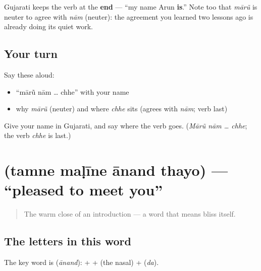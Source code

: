 \begin{grammarlens}[title={Grammar Lens: the verb goes last}]
Gujarati keeps the verb at the \textbf{end} — \textquotedblleft{}my name Arun \textbf{is}.\textquotedblright{} Note too that \emph{mārũ} is neuter to agree with \emph{nām} (neuter): the agreement you learned two lessons ago is already doing its quiet work.
\end{grammarlens}

\subsection*{Your turn}
Say these aloud:

\begin{itemize}
\raggedright
  \item \textquotedblleft{}mārũ nām … chhe\textquotedblright{} with your name
  \item why \emph{mārũ} (neuter) and where \emph{chhe} sits (agrees with \emph{nām}; verb last)
\end{itemize}

\begin{tcolorbox}[breakable,colback=teal!4,colframe=teal!35!black,title={Before you move on}]
Give your name in Gujarati, and say where the verb goes. (\emph{Mārũ nām … chhe}; the verb \emph{chhe} is last.)
\end{tcolorbox}
\section[\texorpdfstring{\gu{તમને} \gu{મળીને} \gu{આનંદ} \gu{થયો} (tamne maḷīne …)}{તમને મળીને આનંદ થયો (tamne maḷīne …)}]{    (tamne maḷīne ānand thayo) — \textquotedblleft{}pleased to meet you\textquotedblright{}}

\label{lesson:GU-C02-anand}



\begin{quote}
The warm close of an introduction — a word that means bliss itself.
\end{quote}

\subsection*{The letters in this word}
The key word is \textbf{} (\emph{ānand}): \textbf{} + \textbf{} + \textbf{} (the nasal) + \textbf{} (\emph{da}).

